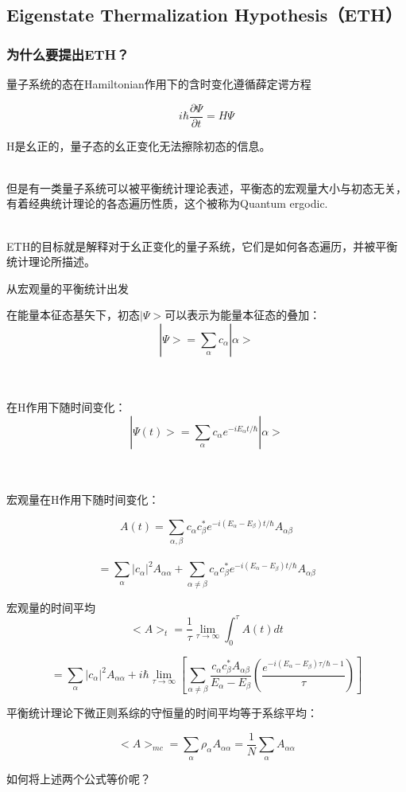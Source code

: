 \documentclass{beamer}
\begin{document}
\subsection{Eigenstate Thermalization Hypothesis（ETH）}
\begin{frame}
\frametitle{为什么要提出ETH？}
量子系统的态在Hamiltonian作用下的含时变化遵循薛定谔方程

$$ i \hbar\frac{\partial \Psi}{\partial t}=H\Psi$$

\pause H是幺正的，量子态的幺正变化无法擦除初态的信息。
\\~

\pause 但是有一类量子系统可以被平衡统计理论表述，平衡态的宏观量大小与初态无关，有着经典统计理论的各态遍历性质，这个被称为Quantum ergodic.
\\~

\pause ETH的目标就是解释对于幺正变化的量子系统，它们是如何各态遍历，并被平衡统计理论所描述。

\end{frame}

\begin{frame}{从宏观量的平衡统计出发}

在能量本征态基矢下，初态$|\Psi>$可以表示为能量本征态的叠加：
$$|\Psi>=\sum_{\alpha}c_{\alpha}|\alpha>$$
\\~

在H作用下随时间变化：
$$|\Psi(t)>=\sum_{\alpha}c_{\alpha}e^{-i E_\alpha t/\hbar}|\alpha>$$
\\~

宏观量在H作用下随时间变化：


$$A(t)=\sum_{\alpha,\beta}c_{\alpha}c_{\beta}^{*}e^{-i(E_\alpha-E_\beta) t/\hbar}A_{\alpha \beta}$$\\

$$=\sum_{\alpha}|c_{\alpha}|^{2}A_{\alpha \alpha}+\sum_{\alpha \ne \beta}c_{\alpha}c_{\beta}^{*}e^{-i(E_\alpha-E_\beta) t/\hbar}A_{\alpha \beta}$$
\end{frame}

\begin{frame}
宏观量的时间平均
$$<A>_t=\frac{1}{\tau}\lim_{\tau \to \infty}\int_{0}^{\tau}A(t)dt $$

$$=\sum_{\alpha}|c_{\alpha}|^{2}A_{\alpha \alpha}+i\hbar\lim_{\tau\to \infty}[\sum_{\alpha\ne\beta}\frac{c_{\alpha}c_{\beta}^{*}A_{\alpha \beta}}{E_\alpha-E_\beta}(\frac{e^{-i(E_\alpha-E_\beta)\tau/\hbar-1}}{\tau})]$$

平衡统计理论下微正则系综的守恒量的时间平均等于系综平均：

$$<A>_{mc}=\sum_{\alpha}{\rho_\alpha A_{\alpha\alpha}}=\frac{1}{N}\sum_{\alpha}{A_{\alpha\alpha}}$$

\pause 如何将上述两个公式等价呢？

\end{frame}
\end{document}
